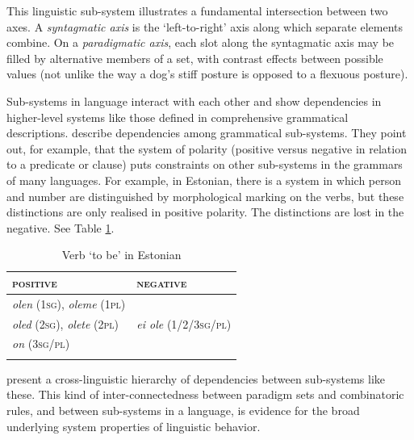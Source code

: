 This linguistic sub-system illustrates a fundamental 
intersection between two axes. A \textit{syntagmatic axis} is the `left-to-right' axis along 
which separate elements combine. On a \textit{paradigmatic axis}, each slot along the syntagmatic axis
may be filled by alternative members of a set, with contrast 
effects between possible values (not unlike the way a dog's stiff posture 
is opposed to a flexuous posture). 



Sub-systems in language interact with each other and show dependencies 
in higher-level systems like those defined in comprehensive 
grammatical descriptions. \citet{aikhenvald_dependencies_1998} describe 
dependencies among grammatical sub-systems. They point out, for example, that 
the system of polarity (positive versus negative in relation to a 
predicate or clause) puts constraints on other sub-systems in the grammars of 
many languages. For example, in Estonian, there is a system in which person and number are 
distinguished by morphological marking on the verbs, but these 
distinctions are only realised in positive polarity. The distinctions 
are lost in the negative. See Table \ref{verbtobeinestonian}.





\begin{table}[h]
\centering
\begin{tabular}{ll}
\lsptoprule
\textsc{positive} & \textsc{negative} \\
\midrule
\textit{olen} (\textsc{1sg)}, \textit{oleme} (\textsc{1pl}) 
& \\

\textit{oled} (\textsc{2sg)}, \textit{olete }(\textsc{2pl)} & 
\textit{ei ole} (1/2/3\textsc{sg/pl}) \\

\textit{on} (\textsc{3sg/pl}) & \\
\lspbottomrule
\end{tabular}
\caption{Verb \textquoteleft to be' in Estonian}
\label{verbtobeinestonian}
\end{table}


\citet{aikhenvald_dependencies_1998} present a cross-linguistic hierarchy of dependencies between sub-systems like these. This kind of inter-connectedness between 
paradigm sets and combinatoric rules, and between sub-systems in a 
language, is evidence for the broad underlying system properties of 
linguistic behavior. 



